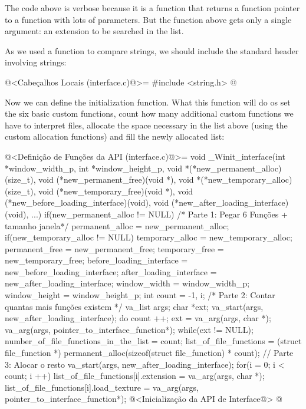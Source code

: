 The code above is verbose because it is a function that returns a
function pointer to a function with lots of parameters. But the
function above gets only a single argument: an extension to be
searched in the list.

As we used a function to compare strings, we should include the
standard header involving strings:

\iniciocodigo
@<Cabeçalhos Locais (interface.c)@>=
#include <string.h>
@
\fimcodigo


Now we can define the initialization function. What this function will
do os set the six basic custom functions, count how many additional
custom functions we have to interpret files, allocate the space
necessary in the list above (using the custom allocation functions)
and fill the newly allocated list:

\iniciocodigo
@<Definição de Funções da API (interface.c)@>=
void _Winit_interface(int *window_width_p, int *window_height_p,
                      void *(*new_permanent_alloc)(size_t),
                      void (*new_permanent_free)(void *),
                      void *(*new_temporary_alloc)(size_t),
                      void (*new_temporary_free)(void *),
                      void (*new_before_loading_interface)(void),
                      void (*new_after_loading_interface)(void), ...){
  if(new_permanent_alloc != NULL) /* Parte 1: Pegar 6 Funções + tamanho janela*/
    permanent_alloc = new_permanent_alloc;
  if(new_temporary_alloc != NULL)
    temporary_alloc = new_temporary_alloc;
  permanent_free = new_permanent_free;
  temporary_free = new_temporary_free;
  before_loading_interface = new_before_loading_interface;
  after_loading_interface = new_after_loading_interface;
  window_width = window_width_p;
  window_height = window_height_p;
  {
    int count = -1, i; /* Parte 2: Contar quantas mais funções existem */
    va_list args;
    char *ext;
    va_start(args, new_after_loading_interface);
    do{
      count ++;
      ext = va_arg(args, char *);
      va_arg(args, pointer_to_interface_function*);
    } while(ext != NULL);
    number_of_file_functions_in_the_list = count;
    list_of_file_functions = (struct file_function *)
                               permanent_alloc(sizeof(struct file_function) * 
                                               count); // Parte 3: Alocar o resto
    va_start(args, new_after_loading_interface);
    for(i = 0; i < count; i ++){
      list_of_file_functions[i].extension = va_arg(args, char *);
      list_of_file_functions[i].load_texture =
                          va_arg(args, pointer_to_interface_function*);
    }
  }
  @<Inicialização da API de Interface@>
}
@
\fimcodigo


